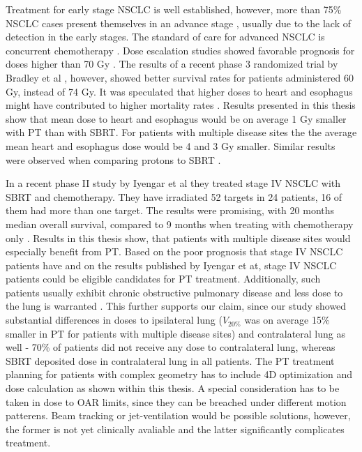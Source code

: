 \documentclass[type=dr, dr=rernat, accentcolor=tud7b,colorbacktitle, bigchapter, openright, twoside, 12pt ]{tudthesis}
\begin{document}
Treatment for early stage NSCLC is well established, however, more than 75\% NSCLC cases present themselves in an advance stage \cite{Jemal2009}, 
usually due to the lack of detection in the early stages. The standard of care for advanced NSCLC is concurrent chemotherapy \cite{Oshiro2014}.
Dose escalation studies showed favorable prognosis for doses higher than 70 Gy \cite{Hayman2001, Rosenman2002, Socinski2008}. 
The results of a recent phase 3 randomized trial by Bradley et al \cite{Bradley2010}, however, showed better survival rates for patients administered 60 Gy,
instead of 74 Gy. It was speculated that higher doses to heart and esophagus might have contributed to higher mortality rates \cite{Cox2012}. 
Results presented in this thesis show that mean dose to heart and esophagus would be on average 1 Gy
smaller with PT than with SBRT. For patients with multiple disease sites the the average mean heart and esophagus dose would be 4 and 3 Gy smaller.
Similar results were observed when comparing protons to SBRT \cite{Georg2008}. 

In a recent phase II study by Iyengar et al \cite{Iyengar2014} they treated stage IV NSCLC with SBRT and chemotherapy. 
They have irradiated 52 targets in 24 patients, 16 of them had more than one target. The results were promising, with 20 months median overall survival, 
compared to 9 months when treating with chemotherapy only \cite{Tsao2008}. Results in this thesis show, that patients with multiple disease sites 
would especially benefit from PT. Based on the poor prognosis that stage IV NSCLC patients have and on the results published by Iyengar et at,
stage IV NSCLC patients could be eligible candidates for PT treatment. Additionally, such patients usually exhibit chronic obstructive pulmonary disease and 
less dose to the lung is warranted \cite{Westover2012}. This further supports our claim, since our study showed substantial differences in 
doses to ipsilateral lung ($V_{20\%}$ was on average 15\% smaller in PT for patients with multiple disease sites) and 
contralateral lung as well - 70\% of patients did not receive any dose to contralateral lung, whereas SBRT deposited dose in contralateral lung in all patients.
The PT treatment planning for patients with complex geometry has to include 4D optimization and dose calculation as shown within this thesis. 
A special consideration has to be taken in dose to OAR limits, since they can be breached under different motion patterens.
Beam tracking \cite{Bert2007} or jet-ventilation \cite{Santiago2013} would be possible solutions, however, the former is not yet clinically avaliable and the latter 
significantly complicates treatment.
\end{document}
